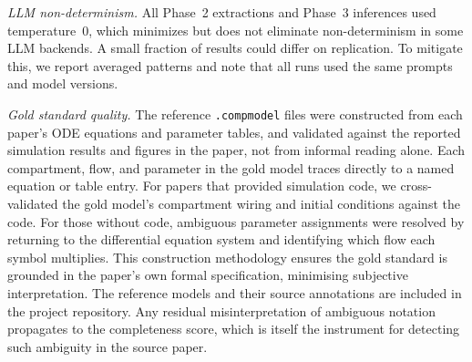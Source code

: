 \textit{LLM non-determinism.}
All Phase~2 extractions and Phase~3 inferences used temperature~0, which minimizes but
does not eliminate non-determinism in some LLM backends. A small fraction of results could
differ on replication. To mitigate this, we report averaged patterns and note that all runs
used the same prompts and model versions.

\textit{Gold standard quality.}
The reference \texttt{.compmodel} files were constructed from each paper's ODE equations
and parameter tables, and validated against the reported simulation results and figures
in the paper, not from informal reading alone.
Each compartment, flow, and parameter in the gold model traces directly to a named
equation or table entry. For papers that provided simulation code, we cross-validated
the gold model's compartment wiring and initial conditions against the code. For those
without code, ambiguous parameter assignments were resolved by returning to the
differential equation system and identifying which flow each symbol multiplies.
This construction methodology ensures the gold standard is grounded in the paper's own
formal specification, minimising subjective interpretation. The reference models and
their source annotations are included in the project repository.
Any residual misinterpretation of ambiguous notation propagates to the completeness score,
which is itself the instrument for detecting such ambiguity in the source paper.